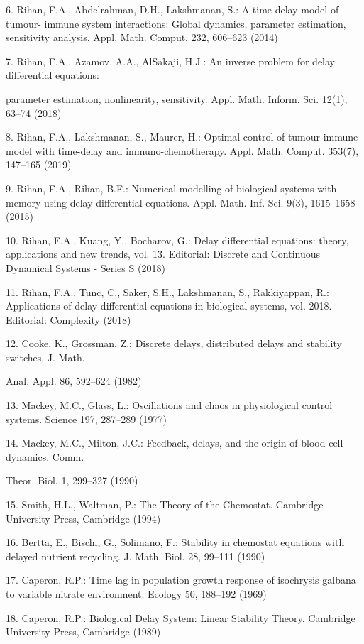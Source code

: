 \documentclass[12pt]{article}
\begin{document}
6. Rihan, F.A., Abdelrahman, D.H., Lakshmanan, S.: A time delay model of tumour- immune system interactions: Global dynamics, parameter 
estimation, sensitivity analysis. Appl. Math. Comput. 232, 606–623 (2014)

7. Rihan, F.A., Azamov, A.A., AlSakaji, H.J.: An inverse problem for delay differential equations:

parameter estimation, nonlinearity, sensitivity. Appl. Math. Inform. Sci. 12(1), 63–74 (2018)

8. Rihan, F.A., Lakshmanan, S., Maurer, H.: Optimal control of tumour-immune model with time-delay and immuno-chemotherapy. Appl. Math. 
Comput. 353(7), 147–165 (2019)

9. Rihan, F.A., Rihan, B.F.: Numerical modelling of biological systems with memory using delay differential equations. Appl. Math. Inf. Sci. 
9(3), 1615–1658 (2015)

10. Rihan, F.A., Kuang, Y., Bocharov, G.: Delay differential equations: theory, applications and new trends, vol. 13. Editorial: Discrete and 
Continuous Dynamical Systems - Series S (2018)

11. Rihan, F.A., Tunc, C., Saker, S.H., Lakshmanan, S., Rakkiyappan, R.: Applications of delay differential equations in biological systems, 
vol. 2018. Editorial: Complexity (2018)

12. Cooke, K., Grossman, Z.: Discrete delays, distributed delays and stability switches. J. Math.

Anal. Appl. 86, 592–624 (1982)

13. Mackey, M.C., Glass, L.: Oscillations and chaos in physiological control systems. Science 197, 287–289 (1977)

14. Mackey, M.C., Milton, J.C.: Feedback, delays, and the origin of blood cell dynamics. Comm.

Theor. Biol. 1, 299–327 (1990)

15. Smith, H.L., Waltman, P.: The Theory of the Chemostat. Cambridge University Press, Cambridge (1994)

16. Bertta, E., Bischi, G., Solimano, F.: Stability in chemostat equations with delayed nutrient recycling. J. Math. Biol. 28, 99–111 (1990)

17. Caperon, R.P.: Time lag in population growth response of isochrysis galbana to variable nitrate environment. Ecology 50, 188–192 (1969)

18. Caperon, R.P.: Biological Delay System: Linear Stability Theory. Cambridge University Press, Cambridge (1989)
\end{document}
